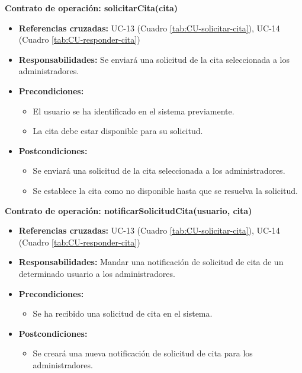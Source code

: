\textbf{Contrato de operación: solicitarCita(cita)}
\begin{itemize}
\item \textbf{Referencias cruzadas:} UC-13 (Cuadro \ref{tab:CU-solicitar-cita}), UC-14 (Cuadro \ref{tab:CU-responder-cita})
\item \textbf{Responsabilidades:} Se enviará una solicitud de la cita seleccionada a los administradores.
\item \textbf{Precondiciones:} 
 \begin{itemize}
\item El usuario se ha identificado en el sistema previamente.
\item La cita debe estar disponible para su solicitud.
\end {itemize}
\item \textbf{Postcondiciones:} 
 \begin{itemize}
\item Se enviará una solicitud de la cita seleccionada a los administradores.
\item Se establece la cita como no disponible hasta que se resuelva la solicitud.
\end {itemize}
\end {itemize}

\textbf{Contrato de operación: notificarSolicitudCita(usuario, cita)}
\begin{itemize}
\item \textbf{Referencias cruzadas:} UC-13 (Cuadro \ref{tab:CU-solicitar-cita}), UC-14 (Cuadro \ref{tab:CU-responder-cita})
\item \textbf{Responsabilidades:} Mandar una notificación de solicitud de cita de un determinado usuario a los administradores.
\item \textbf{Precondiciones:} 
 \begin{itemize}
\item Se ha recibido una solicitud de cita en el sistema.
\end {itemize}
\item \textbf{Postcondiciones:} 
 \begin{itemize}
\item Se creará una nueva notificación de solicitud de cita para los administradores.
\end {itemize}
\end {itemize}

